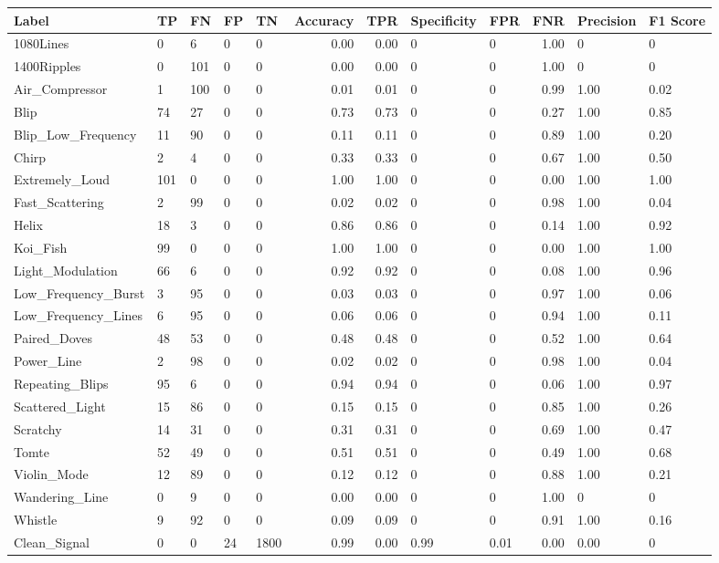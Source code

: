 \begin{tabular}{lllllrrllrll}
\toprule
Label & TP & FN & FP & TN & Accuracy & TPR & Specificity & FPR & FNR & Precision & F1 Score \\
\midrule
1080Lines & 0 & 6 & 0 & 0 & 0.00 & 0.00 & 0 & 0 & 1.00 & 0 & 0 \\
1400Ripples & 0 & 101 & 0 & 0 & 0.00 & 0.00 & 0 & 0 & 1.00 & 0 & 0 \\
Air\_Compressor & 1 & 100 & 0 & 0 & 0.01 & 0.01 & 0 & 0 & 0.99 & 1.00 & 0.02 \\
Blip & 74 & 27 & 0 & 0 & 0.73 & 0.73 & 0 & 0 & 0.27 & 1.00 & 0.85 \\
Blip\_Low\_Frequency & 11 & 90 & 0 & 0 & 0.11 & 0.11 & 0 & 0 & 0.89 & 1.00 & 0.20 \\
Chirp & 2 & 4 & 0 & 0 & 0.33 & 0.33 & 0 & 0 & 0.67 & 1.00 & 0.50 \\
Extremely\_Loud & 101 & 0 & 0 & 0 & 1.00 & 1.00 & 0 & 0 & 0.00 & 1.00 & 1.00 \\
Fast\_Scattering & 2 & 99 & 0 & 0 & 0.02 & 0.02 & 0 & 0 & 0.98 & 1.00 & 0.04 \\
Helix & 18 & 3 & 0 & 0 & 0.86 & 0.86 & 0 & 0 & 0.14 & 1.00 & 0.92 \\
Koi\_Fish & 99 & 0 & 0 & 0 & 1.00 & 1.00 & 0 & 0 & 0.00 & 1.00 & 1.00 \\
Light\_Modulation & 66 & 6 & 0 & 0 & 0.92 & 0.92 & 0 & 0 & 0.08 & 1.00 & 0.96 \\
Low\_Frequency\_Burst & 3 & 95 & 0 & 0 & 0.03 & 0.03 & 0 & 0 & 0.97 & 1.00 & 0.06 \\
Low\_Frequency\_Lines & 6 & 95 & 0 & 0 & 0.06 & 0.06 & 0 & 0 & 0.94 & 1.00 & 0.11 \\
Paired\_Doves & 48 & 53 & 0 & 0 & 0.48 & 0.48 & 0 & 0 & 0.52 & 1.00 & 0.64 \\
Power\_Line & 2 & 98 & 0 & 0 & 0.02 & 0.02 & 0 & 0 & 0.98 & 1.00 & 0.04 \\
Repeating\_Blips & 95 & 6 & 0 & 0 & 0.94 & 0.94 & 0 & 0 & 0.06 & 1.00 & 0.97 \\
Scattered\_Light & 15 & 86 & 0 & 0 & 0.15 & 0.15 & 0 & 0 & 0.85 & 1.00 & 0.26 \\
Scratchy & 14 & 31 & 0 & 0 & 0.31 & 0.31 & 0 & 0 & 0.69 & 1.00 & 0.47 \\
Tomte & 52 & 49 & 0 & 0 & 0.51 & 0.51 & 0 & 0 & 0.49 & 1.00 & 0.68 \\
Violin\_Mode & 12 & 89 & 0 & 0 & 0.12 & 0.12 & 0 & 0 & 0.88 & 1.00 & 0.21 \\
Wandering\_Line & 0 & 9 & 0 & 0 & 0.00 & 0.00 & 0 & 0 & 1.00 & 0 & 0 \\
Whistle & 9 & 92 & 0 & 0 & 0.09 & 0.09 & 0 & 0 & 0.91 & 1.00 & 0.16 \\
Clean\_Signal & 0 & 0 & 24 & 1800 & 0.99 & 0.00 & 0.99 & 0.01 & 0.00 & 0.00 & 0 \\
\bottomrule
\end{tabular}
